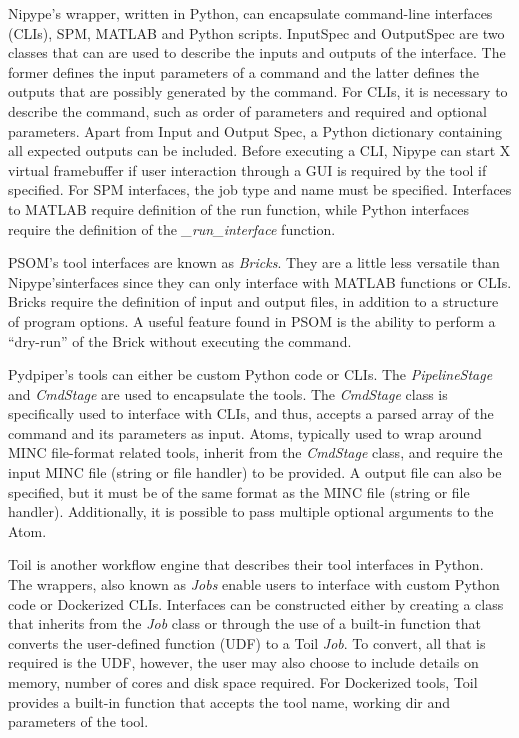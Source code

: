             Nipype's wrapper, written in Python, can encapsulate command-line
            interfaces (CLIs), SPM, MATLAB and Python scripts. InputSpec and
            OutputSpec are two classes that can are used to describe the inputs
            and outputs of the interface. The former defines the input
            parameters of a command and the latter defines the outputs that are
            possibly generated by the command. For CLIs, it is necessary to
            describe the command, such as order of parameters and required and
            optional parameters. Apart from Input and Output Spec, a Python
            dictionary containing all expected outputs can be included. Before
            executing a CLI, Nipype can start X virtual framebuffer if user
            interaction through a GUI is required by the tool if specified. For
            SPM interfaces, the job type and name must be specified. Interfaces
            to MATLAB require definition of the run function, while Python
            interfaces require the definition of the \textit{\_run\_interface}
            function.
            
            PSOM’s tool interfaces are known as \textit{Bricks}. They are a
            little less versatile than Nipype'sinterfaces since they can only
            interface with MATLAB functions or CLIs. Bricks require the
            definition of input and output files, in addition to a structure of
            program options. A useful feature found in PSOM is the ability to
            perform a “dry-run” of the Brick without executing the command.

            Pydpiper's tools can either be custom Python code or CLIs. The
            \textit{PipelineStage} and \textit{CmdStage} are used to encapsulate
            the tools. The \textit{CmdStage} class is specifically used to
            interface with CLIs, and thus, accepts a parsed array of the command
            and its parameters as input. Atoms, typically used to wrap around
            MINC file-format related tools, inherit from the \textit{CmdStage}
            class, and require the input MINC file (string or file handler) to
            be provided. A output file can also be specified, but it must be of
            the same format as the MINC file (string or file handler).
            Additionally, it is possible to pass multiple optional arguments to
            the Atom.

            Toil is another workflow engine that describes their tool interfaces
            in Python. The wrappers, also known as \textit{Jobs} enable users to
            interface with custom Python code or Dockerized
            \cite{merkel2014docker} CLIs. Interfaces can be constructed either
            by creating a class that inherits from the \textit{Job} class or
            through the use of a built-in function that converts the
            user-defined function (UDF) to a Toil \textit{Job}. To convert, all
            that is required is the UDF, however, the user may also choose to
            include details on memory, number of cores and disk space required.
            For Dockerized tools, Toil provides a built-in function that accepts
            the tool name, working dir and parameters of the tool.


